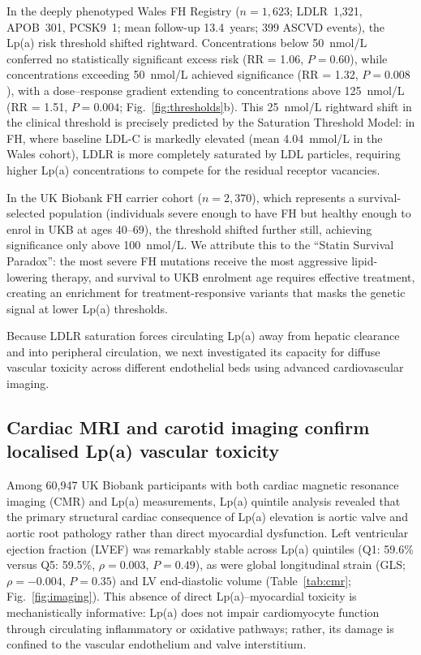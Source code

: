 \documentclass[11pt,a4paper]{article}
\newcommand{\lpa}{Lp(a)}
\newcommand{\ukb}{UK Biobank}
\newcommand{\fh}{FH}
\begin{document}
In the deeply phenotyped Wales \fh{} Registry ($n = 1{,}623$; LDLR~1{,}321, APOB~301, PCSK9~1; mean follow-up 13.4~years; 399 ASCVD events), the \lpa{} risk threshold shifted rightward. Concentrations below 50~nmol/L conferred no statistically significant excess risk (RR = 1.06, $P = 0.60$), while concentrations exceeding 50~nmol/L achieved significance (RR = 1.32, $P = 0.008$), with a dose--response gradient extending to concentrations above 125~nmol/L (RR = 1.51, $P = 0.004$; Fig.~\ref{fig:thresholds}b). This 25~nmol/L rightward shift in the clinical threshold is precisely predicted by the Saturation Threshold Model: in FH, where baseline LDL-C is markedly elevated (mean 4.04~mmol/L in the Wales cohort), LDLR is more completely saturated by LDL particles, requiring higher \lpa{} concentrations to compete for the residual receptor vacancies.

In the \ukb{} FH carrier cohort ($n = 2{,}370$), which represents a survival-selected population (individuals severe enough to have FH but healthy enough to enrol in UKB at ages 40--69), the threshold shifted further still, achieving significance only above 100~nmol/L. We attribute this to the ``Statin Survival Paradox'': the most severe FH mutations receive the most aggressive lipid-lowering therapy, and survival to UKB enrolment age requires effective treatment, creating an enrichment for treatment-responsive variants that masks the genetic signal at lower \lpa{} thresholds\cite{genedy2026}.

Because LDLR saturation forces circulating \lpa{} away from hepatic clearance and into peripheral circulation, we next investigated its capacity for diffuse vascular toxicity across different endothelial beds using advanced cardiovascular imaging.

\subsection*{Cardiac MRI and carotid imaging confirm localised \lpa{} vascular toxicity}

Among 60{,}947 \ukb{} participants with both cardiac magnetic resonance imaging (CMR) and \lpa{} measurements, \lpa{} quintile analysis revealed that the primary structural cardiac consequence of \lpa{} elevation is aortic valve and aortic root pathology rather than direct myocardial dysfunction. Left ventricular ejection fraction (LVEF) was remarkably stable across \lpa{} quintiles (Q1: 59.6\% versus Q5: 59.5\%, $\rho = 0.003$, $P = 0.49$), as were global longitudinal strain (GLS; $\rho = -0.004$, $P = 0.35$) and LV end-diastolic volume (Table~\ref{tab:cmr}; Fig.~\ref{fig:imaging}). This absence of direct \lpa{}--myocardial toxicity is mechanistically informative: \lpa{} does not impair cardiomyocyte function through circulating inflammatory or oxidative pathways; rather, its damage is confined to the vascular endothelium and valve interstitium.
\end{document}
